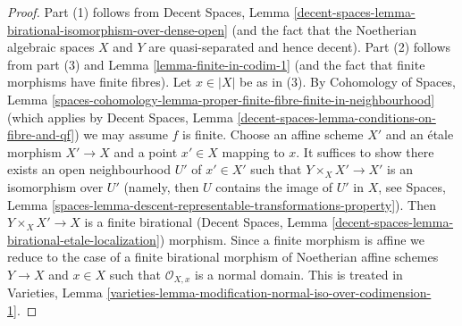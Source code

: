 \documentclass[10pt,a4paper]{amsart}
\theoremstyle{plain}
\theoremstyle{definition}
\theoremstyle{remark}
\numberwithin{equation}{subsection}
\begin{document}
\begin{proof}
Part (1) follows from Decent Spaces, Lemma
\ref{decent-spaces-lemma-birational-isomorphism-over-dense-open}
(and the fact that the Noetherian algebraic spaces $X$ and $Y$
are quasi-separated and hence decent).
Part (2) follows from part (3) and Lemma \ref{lemma-finite-in-codim-1}
(and the fact that finite morphisms have finite fibres).
Let $x \in |X|$ be as in (3). By
Cohomology of Spaces, Lemma
\ref{spaces-cohomology-lemma-proper-finite-fibre-finite-in-neighbourhood}
(which applies by Decent Spaces, Lemma
\ref{decent-spaces-lemma-conditions-on-fibre-and-qf})
we may assume $f$ is finite. Choose an affine scheme $X'$ and
an \'etale morphism $X' \to X$ and a point $x' \in X$ mapping to $x$.
It suffices to show there exists an open neighbourhood $U'$ of $x' \in X'$
such that $Y \times_X X' \to X'$ is an isomorphism over $U'$
(namely, then $U$ contains the image of $U'$ in $X$, see Spaces, Lemma
\ref{spaces-lemma-descent-representable-transformations-property}).
Then $Y \times_X X' \to X$ is a finite birational
(Decent Spaces, Lemma \ref{decent-spaces-lemma-birational-etale-localization})
morphism. Since a finite morphism is affine we reduce to
the case of a finite birational morphism of Noetherian affine schemes
$Y \to X$ and $x \in X$ such that $\mathcal{O}_{X, x}$ is a
normal domain. This is treated in Varieties, Lemma
\ref{varieties-lemma-modification-normal-iso-over-codimension-1}.
\end{proof}
\end{document}
